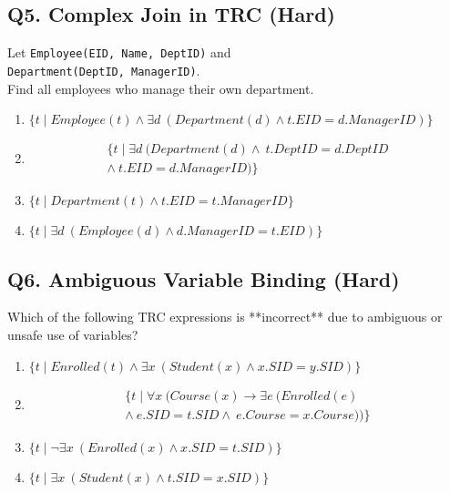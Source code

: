 \subsection*{Q5. Complex Join in TRC (Hard)}
Let \texttt{Employee(EID, Name, DeptID)} and\\ 
\texttt{Department(DeptID, ManagerID)}. \\
Find all employees who manage their own department.

\begin{enumerate}[label=(\alph*)]
    \item $\{ t \mid Employee(t) \wedge \exists d\ (Department(d) \wedge t.EID = d.ManagerID) \}$
    \item
        \begin{multline*}
        \{ t \mid \exists d\ (Department(d) \wedge\ t.DeptID = d.DeptID \\
        \wedge\ t.EID = d.ManagerID) \}
        \end{multline*}
    \item $\{ t \mid Department(t) \wedge t.EID = t.ManagerID \}$
    \item $\{ t \mid \exists d\ (Employee(d) \wedge d.ManagerID = t.EID) \}$
\end{enumerate}

\subsection*{Q6. Ambiguous Variable Binding (Hard)}
Which of the following TRC expressions is **incorrect** due to ambiguous or unsafe use of variables?

\begin{enumerate}[label=(\alph*)]
    \item $\{ t \mid Enrolled(t) \wedge \exists x\ (Student(x) \wedge x.SID = y.SID) \}$
    \item \begin{multline*}
            \{ t \mid \forall x\ (Course(x) \rightarrow \exists e\ (Enrolled(e) \\
            \wedge\ e.SID = t.SID \wedge\ e.Course = x.Course)) \}
            \end{multline*}
    \item $\{ t \mid \neg \exists x\ (Enrolled(x) \wedge x.SID = t.SID) \}$
    \item $\{ t \mid \exists x\ (Student(x) \wedge t.SID = x.SID) \}$
\end{enumerate}
\newpage
